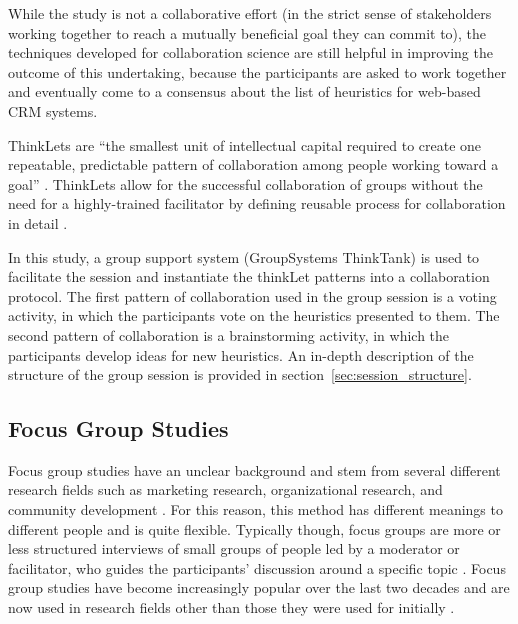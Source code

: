 While the study is not a collaborative effort (in the strict sense of stakeholders working together to reach a mutually beneficial goal they can commit to), the techniques developed for collaboration science are still helpful in improving the outcome of this undertaking, because the participants are asked to work together and eventually come to a consensus about the list of heuristics for web-based CRM systems.

ThinkLets are ``the smallest unit of intellectual capital required to create one repeatable, predictable pattern of collaboration among people working toward a goal'' \citep{Briggs2003}. ThinkLets allow for the successful collaboration of groups without the need for a highly-trained facilitator by defining reusable process for collaboration in detail \citep{Vreede2005}.

In this study, a group support system (GroupSystems ThinkTank\texttrademark) is used to facilitate the session and instantiate the thinkLet patterns into a collaboration protocol. The first pattern of collaboration used in the group session is a voting activity, in which the participants vote on the heuristics presented to them. The second pattern of collaboration is a brainstorming activity, in which the participants develop ideas for new heuristics. An in-depth description of the structure of the group session is provided in section~\ref{sec:session_structure}.


\subsection{Focus Group Studies}
Focus group studies have an unclear background and stem from several different research fields such as marketing research, organizational research, and community development \citep[p.\ 18]{Barbour2008}. For this reason, this method has different meanings to different people and is quite flexible. Typically though, focus groups are more or less structured interviews of small groups of people led by a moderator or facilitator, who guides the participants' discussion around a specific topic \citep{Barbour2008,Morgan1998}. Focus group studies have become increasingly popular over the last two decades and are now used in research fields other than those they were used for initially \citep{Morgan1998}.

